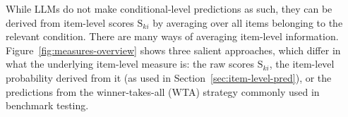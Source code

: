 \documentclass[fleqn]{article}
\begin{document}
While LLMs do not make conditional-level predictions as such, they can be derived from item-level scores $\text{S}_{ki}$ by averaging over all items belonging to the relevant condition.
There are many ways of averaging item-level information.
Figure~\ref{fig:measures-overview} shows three salient approaches, which differ in what the underlying item-level measure is: the raw scores $\text{S}_{ki}$, the item-level probability derived from it (as used in Section~\ref{sec:item-level-pred}), or the predictions from the winner-takes-all (WTA) strategy commonly used in benchmark testing.

\end{document}
